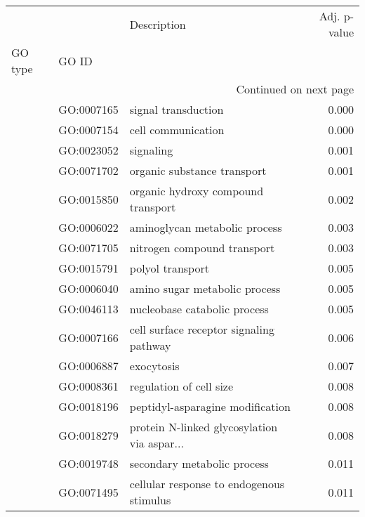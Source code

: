 \begin{longtable}{lllr}
\toprule
   &            &                                  Description &  Adj. p-value \\
GO type & GO ID &                                              &               \\
\midrule
\endhead
\midrule
\multicolumn{4}{r}{{Continued on next page}} \\
\midrule
\endfoot

\bottomrule
\endlastfoot
\multirow{70}{*}{BP} & GO:0007165 &                          signal transduction &         0.000 \\
   & GO:0007154 &                           cell communication &         0.000 \\
   & GO:0023052 &                                    signaling &         0.001 \\
   & GO:0071702 &                  organic substance transport &         0.001 \\
   & GO:0015850 &           organic hydroxy compound transport &         0.002 \\
   & GO:0006022 &                aminoglycan metabolic process &         0.003 \\
   & GO:0071705 &                  nitrogen compound transport &         0.003 \\
   & GO:0015791 &                             polyol transport &         0.005 \\
   & GO:0006040 &                amino sugar metabolic process &         0.005 \\
   & GO:0046113 &                 nucleobase catabolic process &         0.005 \\
   & GO:0007166 &      cell surface receptor signaling pathway &         0.006 \\
   & GO:0006887 &                                   exocytosis &         0.007 \\
   & GO:0008361 &                      regulation of cell size &         0.008 \\
   & GO:0018196 &             peptidyl-asparagine modification &         0.008 \\
   & GO:0018279 &  protein N-linked glycosylation via aspar... &         0.008 \\
   & GO:0019748 &                  secondary metabolic process &         0.011 \\
   & GO:0071495 &     cellular response to endogenous stimulus &         0.011 \\

\end{longtable}
